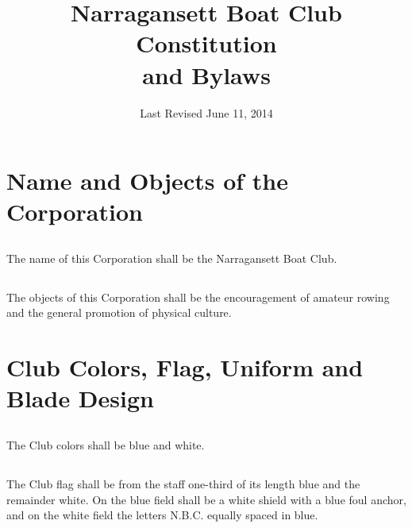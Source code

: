 \documentclass[11pt,american,letterpaper,]{constitution}
\title{Narragansett Boat Club Constitution\\and Bylaws}
\date{Last Revised June 11, 2014}
\author{}
\begin{document}
\frontmatter

\maketitle

\tableofcontents

\mainmatter

\section{Name and Objects of the Corporation}

\subsection[Name]{}

The name of this Corporation shall be the Narragansett Boat Club.

\subsection[Object]{}

The objects of this Corporation shall be the encouragement of amateur rowing and the general promotion of physical culture.

\section{Club Colors, Flag, Uniform and Blade Design}

\subsection[Colors]{}

The Club colors shall be blue and white.

\subsection[Flag]{}

The Club flag shall be from the staff one-third of its length blue and the remainder white. On the blue field shall be a white shield with a blue foul anchor, and on the white field the letters N.B.C. equally spaced in blue.

\subsection[Logo]{} 
\end{document}
